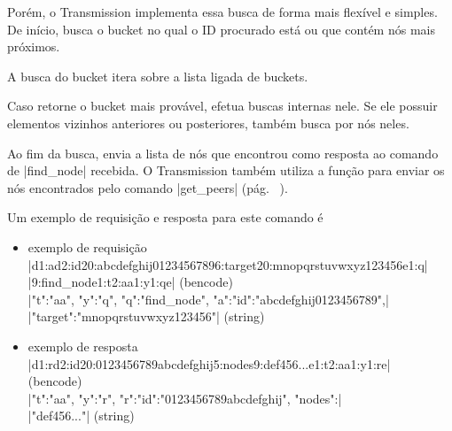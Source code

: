Porém, o Transmission implementa essa busca de forma mais flexível e simples. De início,
busca o \gls*{bucket} no qual o ID procurado está ou que contém nós mais próximos.


A busca do \gls*{bucket} itera sobre a lista ligada de \glspl*{bucket}.


Caso retorne o \gls*{bucket} mais provável, efetua buscas internas nele. Se ele possuir
elementos vizinhos anteriores ou posteriores, também busca por nós neles.


Ao fim da busca, envia a lista de nós que encontrou como resposta ao comando de
\bverb|find_node| recebida. O Transmission também utiliza a função para enviar os nós
encontrados pelo comando \bverb|get_peers| (pág. ~\pageref{subsubsubsec:getpeers}).


Um exemplo de requisição e resposta para este comando é

\begin{itemize}
    \item exemplo de requisição \\
        \bverb|d1:ad2:id20:abcdefghij01234567896:target20:mnopqrstuvwxyz123456e1:q| \\
        \bverb|9:find_node1:t2:aa1:y1:qe| (\gls*{bencode}) \\
        \sverb|{"t":"aa", "y":"q", "q":"find_node", "a":{"id":"abcdefghij0123456789",| \\
        \sverb|"target":"mnopqrstuvwxyz123456"}}| (\gls*{string})

    \item exemplo de resposta \\
        \bverb|d1:rd2:id20:0123456789abcdefghij5:nodes9:def456...e1:t2:aa1:y1:re| \\
        (\gls*{bencode}) \\
        \sverb|{"t":"aa", "y":"r", "r":{"id":"0123456789abcdefghij", "nodes":| \\
        \sverb|"def456..."}}| (\gls*{string})
\end{itemize}
